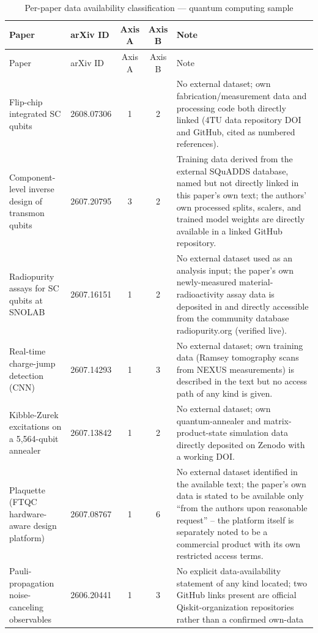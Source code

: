 \documentclass[11pt]{article}
\begin{document}
\begin{longtable}{@{}p{4.3cm} p{1.3cm} c c p{5.3cm}@{}}
\caption{Per-paper data availability classification --- quantum computing sample} \label{tab:results-quantum} \\
\toprule
Paper & arXiv ID & Axis A & Axis B & Note \\
\midrule
\endfirsthead
\toprule
Paper & arXiv ID & Axis A & Axis B & Note \\
\midrule
\endhead
\bottomrule
\endfoot

Flip-chip integrated SC qubits & 2608.07306 & 1 & 2 &
No external dataset; own fabrication/measurement data and processing code both
directly linked (4TU data repository DOI and GitHub, cited as numbered references). \\
\addlinespace
Component-level inverse design of transmon qubits & 2607.20795 & 3 & 2 &
Training data derived from the external SQuADDS database, named but not directly
linked in this paper's own text; the authors' own processed splits, scalers, and
trained model weights are directly available in a linked GitHub repository. \\
\addlinespace
Radiopurity assays for SC qubits at SNOLAB & 2607.16151 & 1 & 2 &
No external dataset used as an analysis input; the paper's own newly-measured
material-radioactivity assay data is deposited in and directly accessible from the
community database radiopurity.org (verified live). \\
\addlinespace
Real-time charge-jump detection (CNN) & 2607.14293 & 1 & 3 &
No external dataset; own training data (Ramsey tomography scans from NEXUS
measurements) is described in the text but no access path of any kind is given. \\
\addlinespace
Kibble-Zurek excitations on a 5,564-qubit annealer & 2607.13842 & 1 & 2 &
No external dataset; own quantum-annealer and matrix-product-state simulation data
directly deposited on Zenodo with a working DOI. \\
\addlinespace
Plaquette (FTQC hardware-aware design platform) & 2607.08767 & 1 & 6 &
No external dataset identified in the available text; the paper's own data is stated
to be available only ``from the authors upon reasonable request'' -- the platform
itself is separately noted to be a commercial product with its own restricted access
terms. \\
\addlinespace
Pauli-propagation noise-canceling observables & 2606.20441 & 1 & 3 &
No explicit data-availability statement of any kind located; two GitHub links present
are official Qiskit-organization repositories rather than a confirmed own-data

\end{longtable}
\end{document}
